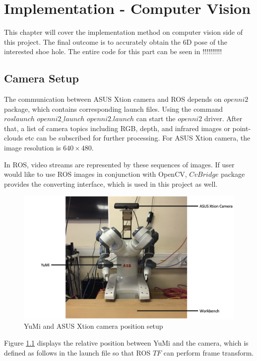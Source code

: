 \chapter{Implementation - Computer Vision}

This chapter will cover the implementation method on computer vision side of this project. The final outcome is to accurately obtain the 6D pose of the interested shoe hole. The entire code for this part can be seen in !!!!!!!!!!

\section{Camera Setup}
The communication between ASUS Xtion camera and ROS depends on $openni2$ package, which contains corresponding launch files. Using the command $roslaunch$ $openni2\_launch$ $openni2.launch$ can start the $openni2$ driver. After that, a list of camera topics including RGB, depth, and infrared images or point-clouds etc can be subscribed for further processing. For ASUS Xtion camera, the image resolution is $640 \times 480$. 

In ROS, video streams are represented by these sequences of images. If user would like to use ROS images in conjunction with OpenCV, $CvBridge$ package provides the converting interface, which is used in this project as well.

\begin{figure}[H]
\centering
\includegraphics[width = \columnwidth]{Implementation/cv/yumicamera.png}
\caption{YuMi and ASUS Xtion camera position setup}
\label{5.1}
\end{figure}

Figure \ref{5.1} displays the relative position between YuMi and the camera, which is defined as follows in the launch file so that ROS $TF$ can perform frame transform.

